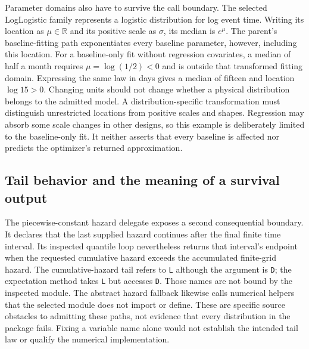 Parameter domains also have to survive the call boundary. The selected
LogLogistic family represents a logistic distribution for log event time.
Writing its location as $\mu\in\mathbb R$ and its positive scale as $\sigma$,
its median is $e^\mu$. The parent's baseline-fitting path exponentiates every
baseline parameter, however, including this location. For a baseline-only fit
without regression covariates, a median of half a month requires
$\mu=\log(1/2)<0$ and is outside that transformed fitting domain. Expressing
the same law in days gives a median of fifteen and location $\log 15>0$.
Changing units should not change whether a physical distribution belongs to
the admitted model. A distribution-specific transformation must distinguish
unrestricted locations from positive scales and shapes. Regression may
absorb some scale changes in other designs, so this example is deliberately
limited to the baseline-only fit. It neither asserts that every baseline is
affected nor predicts the optimizer's returned approximation.
\citep{rel22survdist,rel22survcaller,rel22survwitness}

\subsection{Tail behavior and the meaning of a survival output}
\label{rel22:survival-tail}

The piecewise-constant hazard delegate exposes a second consequential
boundary. It declares that the last supplied hazard continues after the final
finite time interval. Its inspected quantile loop nevertheless returns that
interval's endpoint when the requested cumulative hazard exceeds the
accumulated finite-grid hazard. The cumulative-hazard tail refers to
\texttt{L} although the argument is \texttt{D}; the expectation method takes
\texttt{L} but accesses \texttt{D}. Those names are not bound by the inspected
module. The abstract hazard fallback likewise calls numerical helpers that
the selected module does not import or define. These are specific source
obstacles to admitting these paths, not evidence that every distribution in
the package fails. Fixing a variable name alone would not establish the
intended tail law or qualify the numerical implementation.
\citep{rel22survdist}

